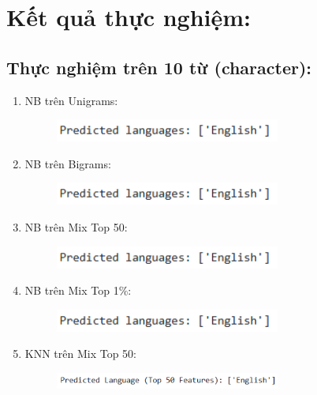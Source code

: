 \section{Kết quả thực nghiệm:}

\subsection{Thực nghiệm trên 10 từ (character):}

\begin{enumerate}
    \item NB trên Unigrams:
    \begin{figure}[H]
    \centering
    \includegraphics[width=0.7\textwidth]{img/docspics/Picture46.png}
\end{figure}
    \item NB trên Bigrams:
    \begin{figure}[H]
    \centering
    \includegraphics[width=0.7\textwidth]{img/docspics/Picture47.png}
\end{figure}
    \item NB trên Mix Top 50:
    \begin{figure}[H]
    \centering
    \includegraphics[width=0.7\textwidth]{img/docspics/Picture48.png}
\end{figure}
    \item NB trên Mix Top 1\%:
    \begin{figure}[H]
    \centering
    \includegraphics[width=0.7\textwidth]{img/docspics/Picture49.png}
\end{figure}
    \item KNN trên Mix Top 50:
    \begin{figure}[H]
    \centering
    \includegraphics[width=0.7\textwidth]{img/docspics/Picture50.png}

\end{figure}
\end{enumerate}
